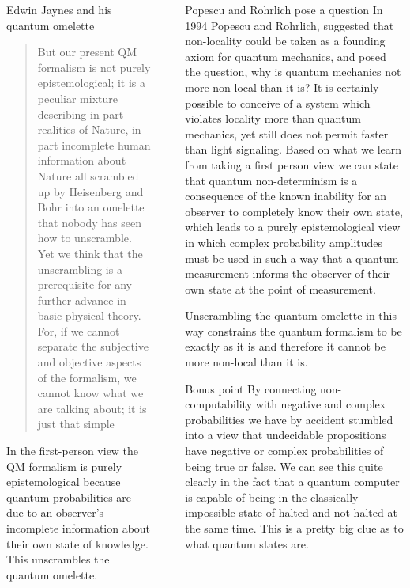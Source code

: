 \documentclass[final]{beamer}
\newlength{\sepwidth}
\newlength{\colwidth}
\newcommand{\separatorcolumn}{\begin{column}{\sepwidth}\end{column}}
\begin{document}
\begin{frame}[t]
\begin{columns}[t]
\begin{column}{\colwidth}
\begin{block}{Edwin Jaynes and his quantum omelette}
  \begin{quote}
      But our present QM formalism is not purely epistemological; it is a peculiar mixture describing in part realities of Nature, in part incomplete human information about Nature all scrambled up by Heisenberg and Bohr into an omelette that nobody has seen how to unscramble. Yet we think that the unscrambling is a prerequisite for any further advance in basic physical theory. For, if we cannot separate the subjective and objective aspects of the formalism, we cannot know what we are talking about; it is just that simple
  \end{quote}
  In the first-person view the QM formalism is purely epistemological because quantum probabilities are due to an observer's incomplete information about their own state of knowledge. This unscrambles the quantum omelette. 
\end{block}

\end{column}
\separatorcolumn
\begin{column}{\colwidth}
\begin{block}{Popescu and Rohrlich pose a question}
In 1994 Popescu and Rohrlich, \autocite{Popescu1994} suggested that non-locality could be taken as a founding axiom for quantum mechanics, and posed the question, why is quantum mechanics not more non-local than it is? It is certainly possible to conceive of a system which violates locality more than quantum mechanics, yet still does not permit faster than light signaling. Based on what we learn from taking a first person view we can state that quantum non-determinism is a consequence of the known inability for an observer to completely know their own state, which leads to a purely epistemological view in which complex probability amplitudes must be used in such a way that a quantum measurement informs the observer of their own state at the point of measurement. 

Unscrambling the quantum omelette in this way constrains the quantum formalism to be exactly as it is and therefore it cannot be more non-local than it is.
\end{block}
\begin{block}{Bonus point}
By connecting non-computability with negative and complex probabilities we have by accident stumbled into a view that undecidable propositions have negative or complex probabilities of being true or false. We can see this quite clearly in the fact that a quantum computer is capable of being in the classically impossible state of halted and not halted at the same time. This is a pretty big clue as to what quantum states are. 


\end{block}
\end{column}
\end{columns}
\end{frame}
\end{document}

